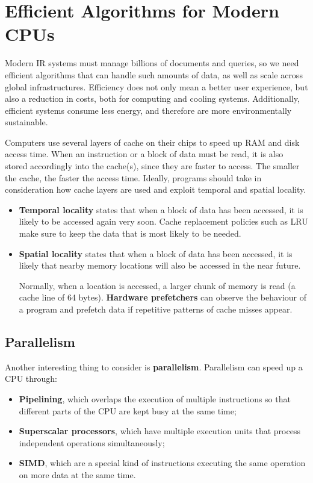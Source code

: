 \chapter{Efficient Algorithms for Modern CPUs}

Modern IR systems must manage billions of documents and queries, so we need efficient algorithms that can handle such amounts of data, as well as scale across global infrastructures. Efficiency does not only mean a better user experience, but also a reduction in costs, both for computing and cooling systems. Additionally, efficient systems consume less energy, and therefore are more environmentally sustainable.

Computers use several layers of cache on their chips to speed up RAM and disk access time. When an instruction or a block of data must be read, it is also stored accordingly into the cache(s), since they are faster to access. The smaller the cache, the faster the access time. Ideally, programs should take in consideration how cache layers are used and exploit temporal and spatial locality.
\begin{itemize}
    \item \textbf{Temporal locality} states that when a block of data has been accessed, it is likely to be accessed again very soon. Cache replacement policies such as LRU make sure to keep the data that is most likely to be needed.
    \item \textbf{Spatial locality} states that when a block of data has been accessed, it is likely that nearby memory locations will also be accessed in the near future.
    
    Normally, when a location is accessed, a larger chunk of memory is read (a cache line of 64 bytes). \textbf{Hardware prefetchers} can observe the behaviour of a program and prefetch data if repetitive patterns of cache misses appear.
\end{itemize}

\section{Parallelism}

Another interesting thing to consider is \textbf{parallelism}. Parallelism can speed up a CPU through:
\begin{itemize}
    \item \textbf{Pipelining}, which overlaps the execution of multiple instructions so that different parts of the CPU are kept busy at the same time;
    \item \textbf{Superscalar processors}, which have multiple execution units that process independent operations simultaneously;
    \item \textbf{SIMD}, which are a special kind of instructions executing the same operation on more data at the same time.
\end{itemize}

